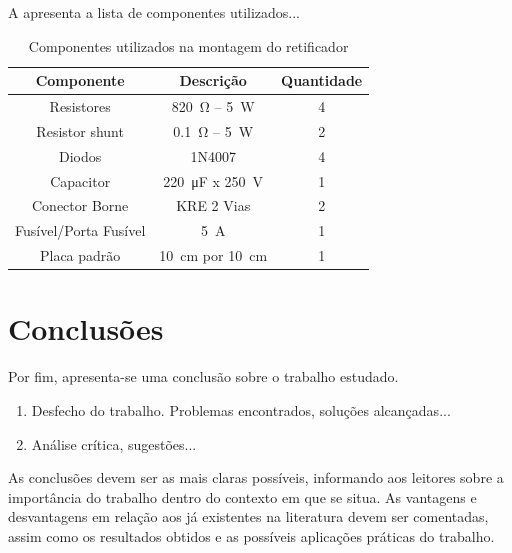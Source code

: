 A  apresenta a lista de componentes utilizados...

\begin{table}[!ht]
	\centering
	\caption{Componentes utilizados na montagem do retificador}
	\label{tab:componentesRetificador}
	\begin{tabular}{@{}ccc@{}}
		\toprule
		\textbf{Componente} & \textbf{Descrição} & \textbf{Quantidade} \\ \midrule
		Resistores          & \SI{820}{\ohm} -- \SI{5}{\W}             & 4                   \\
		Resistor shunt      & \SI{0.1}{\ohm} -- \SI{5}{\W}             & 2                   \\
		Diodos              & 1N4007             & 4                   \\
		Capacitor           & \SI{220}{\micro\farad} x \SI{250}{\V}      & 1                   \\
		Conector Borne      &  KRE 2 Vias    & 2                   \\
		Fusível/Porta Fusível     &  \SI{5}{\A}  & 1                  \\
		Placa padrão        & \SI{10}{\cm} por \SI{10}{\cm}         & 1                   \\ \bottomrule
	\end{tabular}
\end{table}



\section{Conclusões} 

Por fim, apresenta-se uma conclusão sobre o trabalho estudado.
\begin{enumerate}								
	\item  Desfecho do trabalho. Problemas encontrados, soluções alcançadas...
	\item  Análise crítica, sugestões...
\end{enumerate}


As conclusões devem ser as mais claras possíveis, informando aos leitores sobre a importância do trabalho dentro do contexto em que se situa. As vantagens e desvantagens em relação aos já existentes na literatura devem ser comentadas, assim como os resultados obtidos e as possíveis aplicações práticas do trabalho.





\balance


